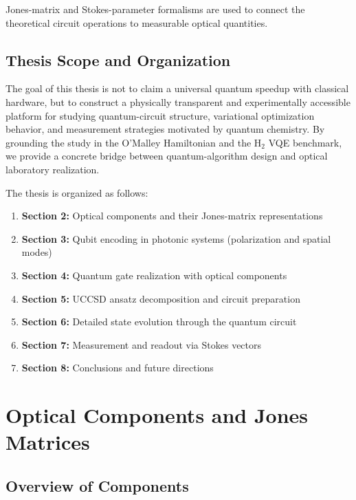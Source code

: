 \documentclass[
	a4paper,
	12pt,
	oneside,
]{article}
\begin{document}
Jones-matrix and Stokes-parameter formalisms are used to connect the theoretical circuit operations to measurable optical quantities.

\subsection{Thesis Scope and Organization}

The goal of this thesis is not to claim a universal quantum speedup with classical hardware, but to construct a physically transparent and experimentally accessible platform for studying quantum-circuit structure, variational optimization behavior, and measurement strategies motivated by quantum chemistry. By grounding the study in the O'Malley Hamiltonian and the H$_2$ VQE benchmark, we provide a concrete bridge between quantum-algorithm design and optical laboratory realization.

The thesis is organized as follows:
\begin{enumerate}
	\item \textbf{Section 2:} Optical components and their Jones-matrix representations
	\item \textbf{Section 3:} Qubit encoding in photonic systems (polarization and spatial modes)
	\item \textbf{Section 4:} Quantum gate realization with optical components
	\item \textbf{Section 5:} UCCSD ansatz decomposition and circuit preparation
	\item \textbf{Section 6:} Detailed state evolution through the quantum circuit
	\item \textbf{Section 7:} Measurement and readout via Stokes vectors
	\item \textbf{Section 8:} Conclusions and future directions
\end{enumerate}


\section{Optical Components and Jones Matrices}

\subsection{Overview of Components}
\end{document}
